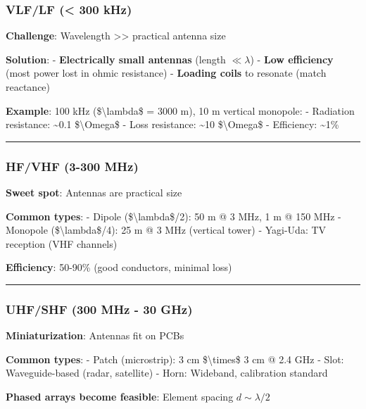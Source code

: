 \subsubsection{VLF/LF (\textless{} 300 kHz)}\label{vlflf-300-khz}

\textbf{Challenge}: Wavelength \textgreater\textgreater{} practical
antenna size

\textbf{Solution}: - \textbf{Electrically small antennas} (length
\(\ll \lambda\)) - \textbf{Low efficiency} (most power lost in ohmic
resistance) - \textbf{Loading coils} to resonate (match reactance)

\textbf{Example}: 100 kHz (\$\textbackslash lambda\$ = 3000 m), 10 m
vertical monopole: - Radiation resistance: \textasciitilde0.1
\$\textbackslash Omega\$ - Loss resistance: \textasciitilde10
\$\textbackslash Omega\$ - Efficiency: \textasciitilde1\%

\begin{center}\rule{0.5\linewidth}{0.5pt}\end{center}

\subsubsection{HF/VHF (3-300 MHz)}\label{hfvhf-3-300-mhz}

\textbf{Sweet spot}: Antennas are practical size

\textbf{Common types}: - Dipole (\$\textbackslash lambda\$/2): 50 m @ 3
MHz, 1 m @ 150 MHz - Monopole (\$\textbackslash lambda\$/4): 25 m @ 3
MHz (vertical tower) - Yagi-Uda: TV reception (VHF channels)

\textbf{Efficiency}: 50-90\% (good conductors, minimal loss)

\begin{center}\rule{0.5\linewidth}{0.5pt}\end{center}

\subsubsection{UHF/SHF (300 MHz - 30
GHz)}\label{uhfshf-300-mhz---30-ghz}

\textbf{Miniaturization}: Antennas fit on PCBs

\textbf{Common types}: - Patch (microstrip): 3 cm
\$\textbackslash times\$ 3 cm @ 2.4 GHz - Slot: Waveguide-based (radar,
satellite) - Horn: Wideband, calibration standard

\textbf{Phased arrays become feasible}: Element spacing
\(d \sim \lambda/2\)

